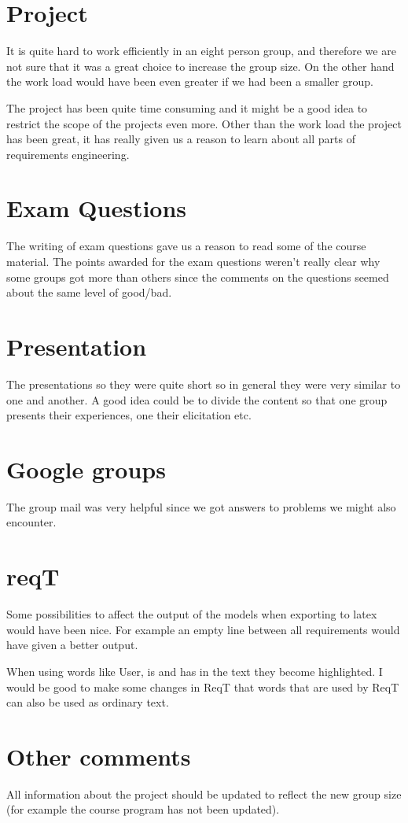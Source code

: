 \documentclass[a4paper]{article}
\begin{document}
	\section{Project}
	It is quite hard to work efficiently in an eight person group, and therefore we are not sure that it was a great choice to increase the group size. On the other hand the work load would have been even greater if we had been a smaller group.
	
	The project has been quite time consuming and it might be a good idea to restrict the scope of the projects even more. Other than the work load the project has been great, it has really given us a reason to learn about all parts of requirements engineering.

	\section{Exam Questions}
	The writing of exam questions gave us a reason to read some of the course material. The points awarded for the exam questions weren't really clear why some groups got more than others since the comments on the questions seemed about the same level of good/bad.	
	
	\section{Presentation}
The presentations so they were quite short so in general they were very similar to	one and another. A good idea could be to divide the content so that one group presents their experiences, one their elicitation etc.

	\section{Google groups}
	The group mail was very helpful since we got answers to problems we might also encounter.

	\section{reqT}
	Some possibilities to affect the output of the models when exporting to latex would have been nice. For example an empty line between all requirements would have given a better output.

	When using words like User, is and has in the text they become highlighted. I would be good to make some changes in ReqT that words that are used by ReqT can also be used as ordinary text.


	\section{Other comments}
	All information about the project should be updated to reflect the new group size (for example the course program has not been updated).
\end{document}
